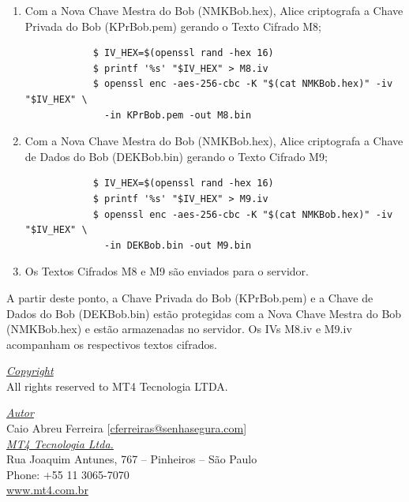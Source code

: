 \documentclass[12pt]{article}
\begin{document}
\begin{enumerate}
\begin{tcolorbox}[width=\textwidth]
{\begin{verbatim}
			$ openssl pkeyutl -decrypt -inkey KPrAlice.pem -in M6.bin -out DEKBob.bin \
			  -pkeyopt rsa_padding_mode:oaep -pkeyopt rsa_oaep_md:sha256
			\end{verbatim}
		}
	\end{tcolorbox}
	\item Com a Nova Chave Mestra do Bob (NMKBob.hex), Alice criptografa a Chave Privada do Bob (KPrBob.pem) gerando o Texto Cifrado M8;
	\begin{tcolorbox}[width=\textwidth]
		{\scriptsize
			\begin{verbatim}
			$ IV_HEX=$(openssl rand -hex 16)
			$ printf '%s' "$IV_HEX" > M8.iv
			$ openssl enc -aes-256-cbc -K "$(cat NMKBob.hex)" -iv "$IV_HEX" \
			  -in KPrBob.pem -out M8.bin
			\end{verbatim}
		}
	\end{tcolorbox}
	\item Com a Nova Chave Mestra do Bob (NMKBob.hex), Alice criptografa a Chave de Dados do Bob (DEKBob.bin) gerando o Texto Cifrado M9;
	\begin{tcolorbox}[width=\textwidth]
		{\scriptsize
			\begin{verbatim}
			$ IV_HEX=$(openssl rand -hex 16)
			$ printf '%s' "$IV_HEX" > M9.iv
			$ openssl enc -aes-256-cbc -K "$(cat NMKBob.hex)" -iv "$IV_HEX" \
			  -in DEKBob.bin -out M9.bin
			\end{verbatim}
		}
	\end{tcolorbox}
	\item Os Textos Cifrados M8 e M9 são enviados para o servidor.
\end{enumerate}

A partir deste ponto, a Chave Privada do Bob (KPrBob.pem) e a Chave de Dados do Bob (DEKBob.bin) estão protegidas com a Nova Chave Mestra do Bob (NMKBob.hex) e estão armazenadas no servidor. Os IVs M8.iv e M9.iv acompanham os respectivos textos cifrados.

\pagebreak

\vspace*{\fill}
\begin{flushright}
	\underline{\textit{Copyright}}\\
	All rights reserved to MT4 Tecnologia LTDA.\bigskip

	\underline{\textit{Autor}}\\
	Caio Abreu Ferreira [\href{mailto:cferreira@senhasegura.com}{cferreiras@senhasegura.com}] \bigskip\\
	
	\underline{\textit{MT4 Tecnologia Ltda.}}\\
	Rua Joaquim Antunes, 767 – Pinheiros – São Paulo\\
	Phone: +55 11 3065-7070\\
	\url{www.mt4.com.br}\\
\end{flushright}
\end{document}
